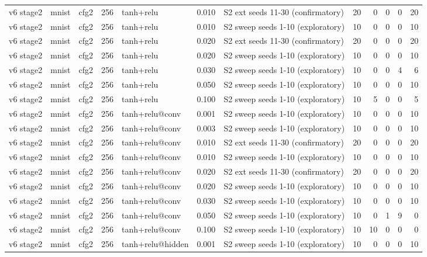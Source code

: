 \begin{table}[htbp]
{\begin{tabular}{@{}lllrlrlrrrrr@{}}
v6 stage2 & mnist & cfg2 & 256 & tanh+relu & 0.010 & S2 ext seeds 11-30 (confirmatory) & 20 & 0 & 0 & 0 & 20 \\
v6 stage2 & mnist & cfg2 & 256 & tanh+relu & 0.010 & S2 sweep seeds 1-10 (exploratory) & 10 & 0 & 0 & 0 & 10 \\
v6 stage2 & mnist & cfg2 & 256 & tanh+relu & 0.020 & S2 ext seeds 11-30 (confirmatory) & 20 & 0 & 0 & 0 & 20 \\
v6 stage2 & mnist & cfg2 & 256 & tanh+relu & 0.020 & S2 sweep seeds 1-10 (exploratory) & 10 & 0 & 0 & 0 & 10 \\
v6 stage2 & mnist & cfg2 & 256 & tanh+relu & 0.030 & S2 sweep seeds 1-10 (exploratory) & 10 & 0 & 0 & 4 & 6 \\
v6 stage2 & mnist & cfg2 & 256 & tanh+relu & 0.050 & S2 sweep seeds 1-10 (exploratory) & 10 & 0 & 0 & 0 & 10 \\
v6 stage2 & mnist & cfg2 & 256 & tanh+relu & 0.100 & S2 sweep seeds 1-10 (exploratory) & 10 & 5 & 0 & 0 & 5 \\
v6 stage2 & mnist & cfg2 & 256 & tanh+relu@conv & 0.001 & S2 sweep seeds 1-10 (exploratory) & 10 & 0 & 0 & 0 & 10 \\
v6 stage2 & mnist & cfg2 & 256 & tanh+relu@conv & 0.003 & S2 sweep seeds 1-10 (exploratory) & 10 & 0 & 0 & 0 & 10 \\
v6 stage2 & mnist & cfg2 & 256 & tanh+relu@conv & 0.010 & S2 ext seeds 11-30 (confirmatory) & 20 & 0 & 0 & 0 & 20 \\
v6 stage2 & mnist & cfg2 & 256 & tanh+relu@conv & 0.010 & S2 sweep seeds 1-10 (exploratory) & 10 & 0 & 0 & 0 & 10 \\
v6 stage2 & mnist & cfg2 & 256 & tanh+relu@conv & 0.020 & S2 ext seeds 11-30 (confirmatory) & 20 & 0 & 0 & 0 & 20 \\
v6 stage2 & mnist & cfg2 & 256 & tanh+relu@conv & 0.020 & S2 sweep seeds 1-10 (exploratory) & 10 & 0 & 0 & 0 & 10 \\
v6 stage2 & mnist & cfg2 & 256 & tanh+relu@conv & 0.030 & S2 sweep seeds 1-10 (exploratory) & 10 & 0 & 0 & 0 & 10 \\
v6 stage2 & mnist & cfg2 & 256 & tanh+relu@conv & 0.050 & S2 sweep seeds 1-10 (exploratory) & 10 & 0 & 1 & 9 & 0 \\
v6 stage2 & mnist & cfg2 & 256 & tanh+relu@conv & 0.100 & S2 sweep seeds 1-10 (exploratory) & 10 & 10 & 0 & 0 & 0 \\
v6 stage2 & mnist & cfg2 & 256 & tanh+relu@hidden & 0.001 & S2 sweep seeds 1-10 (exploratory) & 10 & 0 & 0 & 0 & 10 \\

\end{tabular}}
\end{table}
